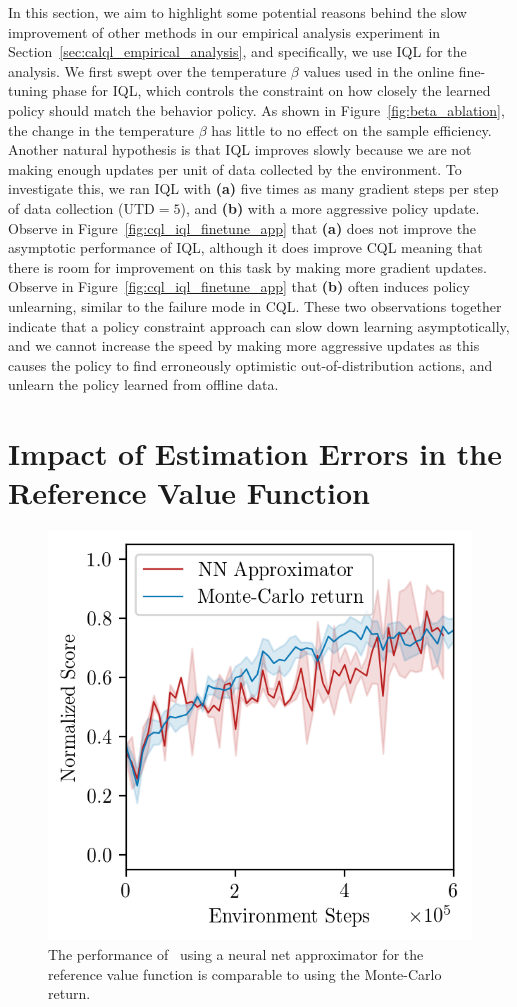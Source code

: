 In this section, we aim to highlight some potential reasons behind the slow improvement of other methods in our empirical analysis experiment in Section~\ref{sec:calql_empirical_analysis}, and specifically, we use IQL for the analysis. We first swept over the temperature $\beta$ values used in the online fine-tuning phase for IQL, which controls the constraint on how closely the learned policy should match the behavior policy. As shown in Figure~\ref{fig:beta_ablation}, the change in the temperature $\beta$ has little to no effect on the sample efficiency. Another natural hypothesis is that IQL improves slowly because we are not making enough updates per unit of data collected by the environment. To investigate this, we ran IQL with \textbf{(a)} five times as many gradient steps per step of data collection ($\text{UTD}=5$), and \textbf{(b)} with a more aggressive policy update. Observe in Figure~\ref{fig:cql_iql_finetune_app} that \textbf{(a)} does not improve the asymptotic performance of IQL, although it does improve CQL meaning that there is room for improvement on this task by making more gradient updates. Observe in Figure~\ref{fig:cql_iql_finetune_app} that \textbf{(b)} often induces policy unlearning, similar to the failure mode in CQL. These two observations together indicate that a policy constraint approach can slow down learning asymptotically, and we cannot increase the speed by making more aggressive updates as this causes the policy to find erroneously optimistic out-of-distribution actions, and unlearn the policy learned from offline data. 


\section{Impact of Estimation Errors in the Reference Value Function}
\label{app:nn_value_function}

\begin{figure}[t]
\vspace{-0.3cm}
\begin{center}
\includegraphics[width=0.35\linewidth]{chapters/cal_ql/figs-sample/kitchen-analysis.png}
\vspace{-0.2cm}
\caption{\footnotesize{The performance of \methodname\ using a neural net approximator for the reference value function is comparable to using the Monte-Carlo return.}}
\label{fig:kitchen-regress}
\vspace{-0.5cm}
\end{center}
\end{figure}

